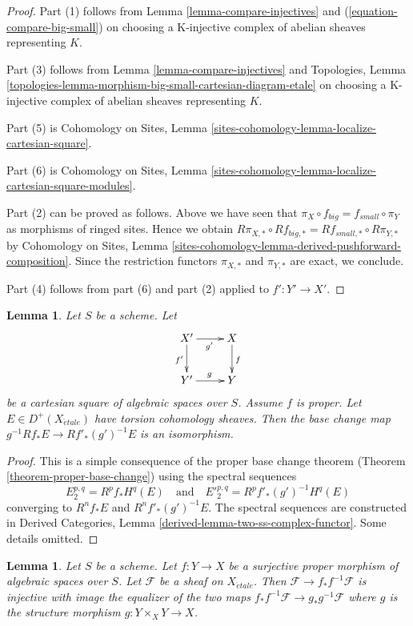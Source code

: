 \documentclass{stacks-project}
\theoremstyle{plain}
\newtheorem{lemma}[subsection]{Lemma}
\theoremstyle{definition}
\theoremstyle{remark}
\numberwithin{equation}{subsection}
\def\etale{{\acute{e}tale}}
\begin{document}
\begin{proof}
Part (1) follows from
Lemma \ref{lemma-compare-injectives}
and (\ref{equation-compare-big-small})
on choosing a K-injective complex of abelian sheaves representing $K$.

\medskip\noindent
Part (3) follows from Lemma \ref{lemma-compare-injectives}
and Topologies, Lemma
\ref{topologies-lemma-morphism-big-small-cartesian-diagram-etale}
on choosing a K-injective complex of abelian sheaves representing $K$.

\medskip\noindent
Part (5) is Cohomology on Sites, Lemma
\ref{sites-cohomology-lemma-localize-cartesian-square}.

\medskip\noindent
Part (6) is  Cohomology on Sites, Lemma
\ref{sites-cohomology-lemma-localize-cartesian-square-modules}.

\medskip\noindent
Part (2) can be proved as follows. Above we have seen
that $\pi_X \circ f_{big} = f_{small} \circ \pi_Y$ as morphisms
of ringed sites. Hence we obtain
$R\pi_{X, *} \circ Rf_{big, *} = Rf_{small, *} \circ R\pi_{Y, *}$
by Cohomology on Sites, Lemma
\ref{sites-cohomology-lemma-derived-pushforward-composition}.
Since the restriction functors $\pi_{X, *}$ and $\pi_{Y, *}$
are exact, we conclude.

\medskip\noindent
Part (4) follows from part (6) and part (2) applied to $f' : Y' \to X'$.
\end{proof}

\begin{lemma}
\label{lemma-proper-base-change}
Let $S$ be a scheme. Let
$$
\xymatrix{
X' \ar[r]_{g'} \ar[d]_{f'} & X \ar[d]^f \\
Y' \ar[r]^g & Y
}
$$
be a cartesian square of algebraic spaces over $S$. Assume $f$ is proper.
Let $E \in D^+(X_\etale)$ have torsion cohomology sheaves.
Then the base change map $g^{-1}Rf_*E \to Rf'_*(g')^{-1}E$
is an isomorphism.
\end{lemma}

\begin{proof}
This is a simple consequence of the proper base change theorem
(Theorem \ref{theorem-proper-base-change}) using the spectral
sequences
$$
E_2^{p, q} = R^pf_*H^q(E)
\quad\text{and}\quad
{E'}_2^{p, q} = R^pf'_*(g')^{-1}H^q(E)
$$
converging to $R^nf_*E$ and $R^nf'_*(g')^{-1}E$.
The spectral sequences are constructed in
Derived Categories, Lemma \ref{derived-lemma-two-ss-complex-functor}.
Some details omitted.
\end{proof}

\begin{lemma}
\label{lemma-surjective-proper}
Let $S$ be a scheme. Let $f : Y \to X$ be a surjective proper morphism
of algebraic spaces over $S$. Let $\mathcal{F}$ be a sheaf on $X_\etale$.
Then $\mathcal{F} \to f_*f^{-1}\mathcal{F}$ is injective with
image the equalizer of the two maps
$f_*f^{-1}\mathcal{F} \to g_*g^{-1}\mathcal{F}$ where
$g$ is the structure morphism $g : Y \times_X Y \to X$.
\end{lemma}
\end{document}
